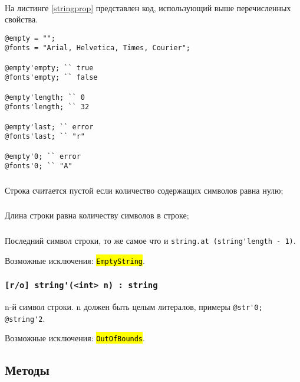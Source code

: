 \documentclass[a4paper, 14pt]{extarticle}
\newcommand{\ferror}[1]{\foreignlanguage{english}{\fontsize{11pt}{12pt}\tt{\sethlcolor{yellow}\hl{#1}}}}
\begin{document}
\

На листинге \ref{stringprop} представлен код, использующий выше перечисленных свойства.

\begin{lstlisting}[caption=Свойства класса string, label=stringprop]
@empty = "";
@fonts = "Arial, Helvetica, Times, Courier";

@empty'empty; `` true
@fonts'empty; `` false

@empty'length; `` 0
@fonts'length; `` 32

@empty'last; `` error
@fonts'last; `` "r"

@empty'0; `` error
@fonts'0; `` "A"
\end{lstlisting}

\subsubsection{}

Строка считается пустой если количество содержащих символов равна нулю;

\subsubsection{}

Длина строки равна количеству символов в строке;

\subsubsection{}

Последний символ строки, то же самое что и \lstinline|string.at (string'length - 1)|.

Возможные исключения: \ferror{EmptyString}.

\subsubsection{\lstinline|[r/o] string'(<int> n) : string|}

n-й символ строки. n должен быть целым литералов, примеры \lstinline|@str'0; @string'2|.

Возможные исключения: \ferror{OutOfBounds}.

\subsection{Методы}
\end{document}
